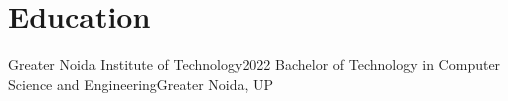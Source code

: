 \section{Education}
    \resumeSubHeadingListStart

    \resumeSubheading
    {Greater Noida Institute of Technology}{2022}
    {Bachelor of Technology in Computer Science and Engineering}{Greater Noida, UP}

    \resumeSubHeadingListEnd